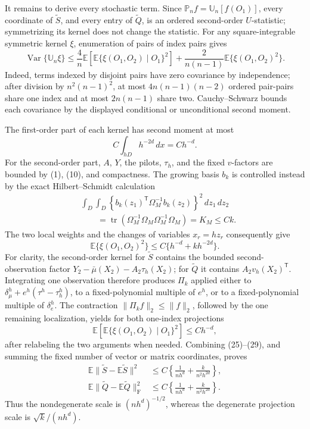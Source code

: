 It remains to derive every stochastic term.  Since \(\mathbb P_nf=\mathbb U_n[f(O_1)]\), every coordinate of \(\widetilde S\), and every entry of \(\widetilde Q\), is an ordered second-order \(U\)-statistic; symmetrizing its kernel does not change the statistic.  For any square-integrable symmetric kernel \(\xi\), enumeration of pairs of index pairs gives
\[
 \operatorname{Var}\{\mathbb U_n\xi\}
 \leq\frac4n\mathbb E\left[\mathbb E\{\xi(O_1,O_2)\mid O_1\}^2\right]
 +\frac{2}{n(n-1)}\mathbb E\{\xi(O_1,O_2)^2\}.
 \tag{25}
\]
Indeed, terms indexed by disjoint pairs have zero covariance by independence; after division by \(n^2(n-1)^2\), at most \(4n(n-1)(n-2)\) ordered pair-pairs share one index and at most \(2n(n-1)\) share two.  Cauchy--Schwarz bounds each covariance by the displayed conditional or unconditional second moment.

The first-order part of each kernel has second moment at most
\[
 C\int_{hD}h^{-2d}\,dx=Ch^{-d}.
 \tag{26}
\]
For the second-order part, \(A\), \(Y\), the pilots, \(\tau_h\), and the fixed \(v\)-factors are bounded by (1), (10), and compactness.  The growing basis \(b_k\) is controlled instead by the exact Hilbert--Schmidt calculation
\[
 \begin{split}
 &\int_D\int_D
 \left\{b_k(z_1)^{\mathsf T}\Omega_M^{-1}b_k(z_2)\right\}^2\,dz_1\,dz_2\\
 &\qquad=\operatorname{tr}\left(
 \Omega_M^{-1}\Omega_M\Omega_M^{-1}\Omega_M\right)
 =K_M\leq Ck.
 \end{split}
 \tag{27}
\]
The two local weights and the changes of variables \(x_r=hz_r\) consequently give
\[
 \mathbb E\{\xi(O_1,O_2)^2\}\leq C\{h^{-d}+kh^{-2d}\}.
 \tag{28}
\]
For clarity, the second-order kernel for \(\widetilde S\) contains the bounded second-observation factor \(Y_2-\bar\mu(X_2)-A_2\tau_h(X_2)\); for \(\widetilde Q\) it contains \(A_2v_h(X_2)^{\mathsf T}\).  Integrating one observation therefore produces \(\Pi_k\) applied either to \(\delta_\mu^h+e^h(\tau^h-\tau_h^h)\), to a fixed-polynomial multiple of \(e^h\), or to a fixed-polynomial multiple of \(\delta_e^h\).  The contraction \(\|\Pi_k f\|_2\leq\|f\|_2\), followed by the one remaining localization, yields for both one-index projections
\[
 \mathbb E\left[\mathbb E\{\xi(O_1,O_2)\mid O_1\}^2\right]\leq Ch^{-d},
 \tag{29}
\]
after relabeling the two arguments when needed.  Combining (25)--(29), and summing the fixed number of vector or matrix coordinates, proves
\[
 \begin{split}
 \mathbb E\|\widetilde S-\mathbb E\widetilde S\|^2
 &\leq C\left\{\frac1{nh^d}+\frac{k}{n^2h^{2d}}\right\},\\
 \mathbb E\|\widetilde Q-\mathbb E\widetilde Q\|_{\mathrm F}^2
 &\leq C\left\{\frac1{nh^d}+\frac{k}{n^2h^{2d}}\right\}.
 \end{split}
 \tag{30}
\]
Thus the nondegenerate scale is \((nh^d)^{-1/2}\), whereas the degenerate projection scale is \(\sqrt{k}/(nh^d)\).

